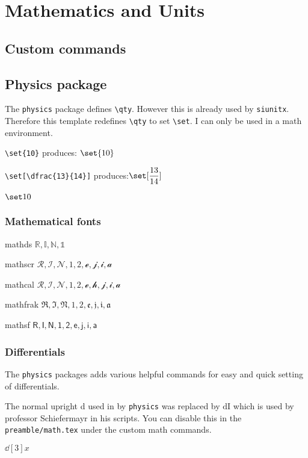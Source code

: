 \section{Mathematics and Units}


\begingroup \small
\subsection{Custom commands}

\I

\subsection{Physics package}

    The \verb|physics| package defines \verb|\qty|. However this is already used by \texttt{siunitx}. Therefore this template redefines \verb|\qty| to set \verb|\set|. I can only be used in a math environment.


    \verb|\set{10}| produces: $\set{10}$

    \verb|\set[\dfrac{13}{14}]|     produces:$\set[\dfrac{13}{14}]$

    $\set10 $

    \subsubsection{Mathematical fonts}

    mathds $\mathds{R, I, N, 1}$

    mathscr $\mathscr{R, I, N, 1, 2, e, j, i, a}$

    mathcal $\mathcal{R, I, N, 1, 2, e,h, j, i, a}$

    mathfrak $\mathfrak{R, I, N, 1, 2, e, j, i, a}$

    mathsf $\mathsf{R, I, N, 1, 2, e, j, i, a}$


    \subsubsection{Differentials}

    The \texttt{physics} packages adds various helpful commands for easy and quick setting of differentials.

    The normal upright d used in by \texttt{physics} was replaced by $\mathrm{d\!I}$ which is used by professor Schiefermayr in his scripts. You can disable this in the \texttt{preamble/math.tex} under the custom math commands.

     $\dd[3]{x}$

